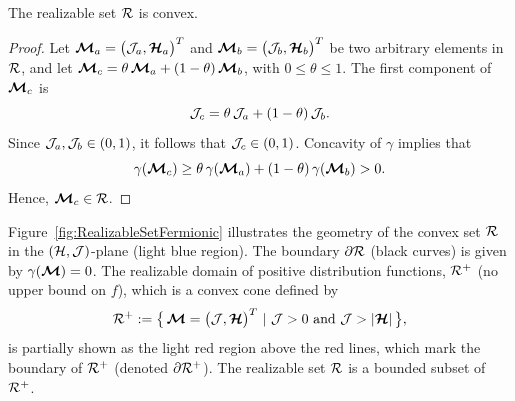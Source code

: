 
\begin{lemma}
  The realizable set $\mathcal{R}$ is convex.  
\end{lemma}
\begin{proof}
  Let $\boldsymbol{\mathcal{M}}_{a}=\big(\mathcal{J}_{a},\boldsymbol{\mathcal{H}}_{a}\big)^{T}$ and $\boldsymbol{\mathcal{M}}_{b}=\big(\mathcal{J}_{b},\boldsymbol{\mathcal{H}}_{b}\big)^{T}$ be two arbitrary elements in $\mathcal{R}$, and let $\boldsymbol{\mathcal{M}}_{c} = \theta\,\boldsymbol{\mathcal{M}}_{a} + (1-\theta)\,\boldsymbol{\mathcal{M}}_{b}$, with $0\leq\theta\leq1$.
  The first component of $\boldsymbol{\mathcal{M}}_{c}$ is
  \begin{equation*}
    \mathcal{J}_{c} = \theta\,\mathcal{J}_{a} + (1-\theta)\,\mathcal{J}_{b}.
  \end{equation*}
  Since $\mathcal{J}_{a},\mathcal{J}_{b} \in (0,1)$, it follows that $\mathcal{J}_{c} \in (0,1)$.  
  Concavity of $\gamma$ implies that
  \begin{equation*}
  \gamma(\boldsymbol{\mathcal{M}}_{c}) \geq \theta\,\gamma(\boldsymbol{\mathcal{M}}_{a}) + (1-\theta)\,\gamma(\boldsymbol{\mathcal{M}}_{b}) > 0.
  \end{equation*}
  Hence, $\boldsymbol{\mathcal{M}}_{c}\in\mathcal{R}$.
\end{proof}

Figure~\ref{fig:RealizableSetFermionic} illustrates the geometry of the convex set $\mathcal{R}$ in the $(\mathcal{H},\mathcal{J})$-plane (light blue region).  
The boundary $\partial\mathcal{R}$ (black curves) is given by $\gamma(\boldsymbol{\mathcal{M}})=0$.  
The realizable domain of positive distribution functions, $\mathcal{R}^{+}$ (no upper bound on $f$), which is a convex cone defined by
\begin{equation}
  \mathcal{R}^{+}:=\big\{\,\boldsymbol{\mathcal{M}}=\big(\mathcal{J},\boldsymbol{\mathcal{H}}\big)^{T}~|~\mathcal{J} > 0~\text{and}~\mathcal{J} > |\boldsymbol{\mathcal{H}}|\,\big\}, 
  \label{eq:realizableSetPositive}
\end{equation}
is partially shown as the light red region above the red lines, which mark the boundary of $\mathcal{R}^{+}$ (denoted $\partial\mathcal{R}^{+}$).  
The realizable set $\mathcal{R}$ is a bounded subset of $\mathcal{R}^{+}$.  

